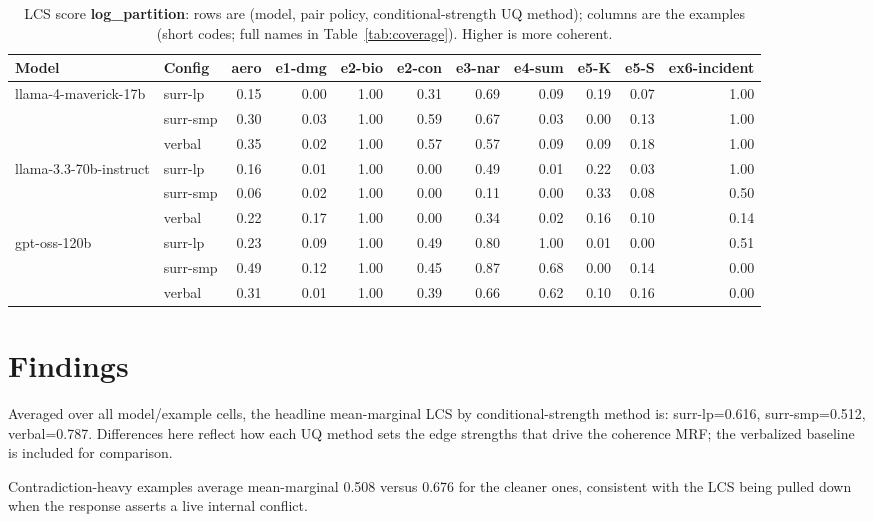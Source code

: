 \documentclass[11pt]{article}
\begin{document}
\begin{table}[htbp]
\centering
\footnotesize
\setlength{\tabcolsep}{3.5pt}
\caption{LCS score \textbf{log\_partition}: rows are (model, pair policy, conditional-strength UQ method); columns are the examples (short codes; full names in Table~\ref{tab:coverage}). Higher is more coherent.}
\label{tab:log-partition}
\begin{tabular}{llrrrrrrrrr}
\toprule
\textbf{Model} & \textbf{Config} & \textbf{aero} & \textbf{e1-dmg} & \textbf{e2-bio} & \textbf{e2-con} & \textbf{e3-nar} & \textbf{e4-sum} & \textbf{e5-K} & \textbf{e5-S} & \textbf{ex6-incident} \\
\midrule
llama-4-maverick-17b & surr-lp & 0.15 & 0.00 & 1.00 & 0.31 & 0.69 & 0.09 & 0.19 & 0.07 & 1.00 \\
 & surr-smp & 0.30 & 0.03 & 1.00 & 0.59 & 0.67 & 0.03 & 0.00 & 0.13 & 1.00 \\
 & verbal & 0.35 & 0.02 & 1.00 & 0.57 & 0.57 & 0.09 & 0.09 & 0.18 & 1.00 \\
\midrule
llama-3.3-70b-instruct & surr-lp & 0.16 & 0.01 & 1.00 & 0.00 & 0.49 & 0.01 & 0.22 & 0.03 & 1.00 \\
 & surr-smp & 0.06 & 0.02 & 1.00 & 0.00 & 0.11 & 0.00 & 0.33 & 0.08 & 0.50 \\
 & verbal & 0.22 & 0.17 & 1.00 & 0.00 & 0.34 & 0.02 & 0.16 & 0.10 & 0.14 \\
\midrule
gpt-oss-120b & surr-lp & 0.23 & 0.09 & 1.00 & 0.49 & 0.80 & 1.00 & 0.01 & 0.00 & 0.51 \\
 & surr-smp & 0.49 & 0.12 & 1.00 & 0.45 & 0.87 & 0.68 & 0.00 & 0.14 & 0.00 \\
 & verbal & 0.31 & 0.01 & 1.00 & 0.39 & 0.66 & 0.62 & 0.10 & 0.16 & 0.00 \\
\bottomrule
\end{tabular}
\end{table}


\section{Findings}

Averaged over all model/example cells, the headline mean-marginal LCS by conditional-strength method is: surr-lp=0.616, surr-smp=0.512, verbal=0.787. Differences here reflect how each UQ method sets the edge strengths that drive the coherence MRF; the verbalized baseline is included for comparison.

Contradiction-heavy examples average mean-marginal 0.508 versus 0.676 for the cleaner ones, consistent with the LCS being pulled down when the response asserts a live internal conflict.
\end{document}
